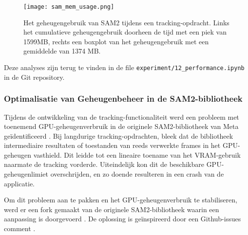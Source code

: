 \begin{figure}[H]
  \centering
  \texttt{[image: sam\_mem\_usage.png]}
  \caption[]{\label{fig:sam-mem-usage} 
  Het geheugengebruik van SAM2 tijdens een tracking-opdracht. Links het cumulatieve geheugengebruik doorheen de tijd met een piek van 1599MB, rechts een boxplot van het geheugengebruik met een gemiddelde van 1374 MB. }
\end{figure}

Deze analyses zijn terug te vinden in de file \texttt{experiment/12\_performance.ipynb} in de Git repository.

\subsubsection{Optimalisatie van Geheugenbeheer in de SAM2-bibliotheek}

Tijdens de ontwikkeling van de tracking-functionaliteit werd een probleem met 
toenemend GPU-geheugenverbruik in de originele SAM2-bibliotheek van Meta geïdentificeerd \autocite{Hu2024facebookresearch}. 
Bij langdurige tracking-opdrachten, bleek dat de bibliotheek intermediaire 
resultaten of toestanden van reeds verwerkte frames in het GPU-geheugen vasthield. 
Dit leidde tot een lineaire toename van het VRAM-gebruik naarmate de tracking vorderde. 
Uiteindelijk kon dit de beschikbare GPU-geheugenlimiet overschrijden, en zo doende resulteren in een crash van de applicatie. 

Om dit probleem aan te pakken en het GPU-geheugenverbruik te stabiliseren, werd er een fork gemaakt van de originele 
SAM2-bibliotheek waarin een aanpassing is doorgevoerd \autocite{Hu2025ilianbronchart}.
De oplossing is geïnspireerd door een Github-issues comment \autocite{heyoeyo2024comment}. 

